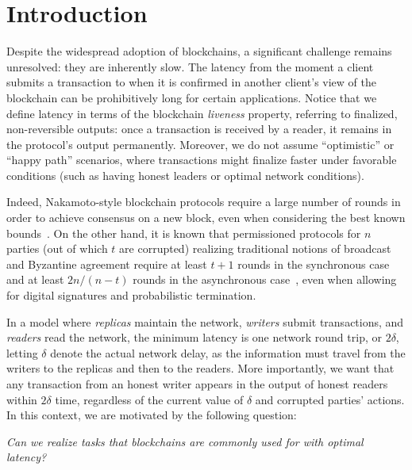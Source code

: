 \section{Introduction}
Despite the widespread adoption of blockchains, a significant challenge remains unresolved: they are inherently slow. The latency from the moment a client submits a transaction to when it is confirmed in another client's view of the blockchain can be prohibitively long for certain applications. Notice that we define latency in terms of the blockchain \emph{liveness} property, referring to finalized, non-reversible outputs: once a transaction is received by a reader, it remains in the protocol's output permanently.
Moreover, we do not assume ``optimistic'' or ``happy path'' scenarios, where transactions might finalize faster under favorable conditions (such as having honest leaders or optimal network conditions).


Indeed, Nakamoto-style blockchain protocols require a large number of rounds in order to achieve consensus on a new block, even when considering the best known bounds~\cite{DBLP:conf/crypto/GaziRR23}. On the other hand, it is known that permissioned protocols for $n$ parties (out of which $t$ are corrupted) realizing traditional notions of broadcast and Byzantine agreement require at least $t+1$ rounds in the synchronous case~\cite{DBLP:journals/ipl/AguileraT99} and at least $2n/(n-t)$ rounds in the asynchronous case~\cite{DBLP:conf/focs/GarayKKO07}, even when allowing for digital signatures and probabilistic termination.


In a model where \emph{replicas} maintain the network, \emph{writers} submit transactions, and \emph{readers} read the network, the minimum latency is one network round trip, or $2\delta$, letting $\delta$ denote the actual network delay, as the information must travel from the writers to the replicas and then to the readers. More importantly, we want that any transaction from an honest writer appears in the output of honest readers within $2\delta$ time, regardless of the current value of $\delta$ and corrupted parties' actions.
In this context, we are motivated by the following question:

\vspace{-2mm}
\begin{center}
	\emph{Can we realize tasks that blockchains are commonly used for with optimal latency?}
\end{center}
\vspace{-2mm}

